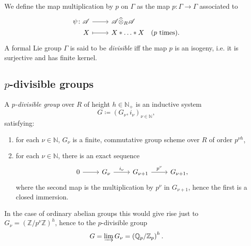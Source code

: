 \documentclass[../Main]{subfiles}
\begin{document}
\begin{defn}
	We define the map multiplication by $p$ on $\Gamma$ as the map $p\colon \Gamma \to \Gamma$
	associated to 
	\begin{equation*}
	\begin{tikzcd}[row sep = 0ex
		,/tikz/column 1/.append style={anchor=base east}
		,/tikz/column 2/.append style={anchor=base west}]
		\psi\colon \mathscr{A} \arrow[r, "", rightarrow] &
		\mathscr{A} \widehat{\otimes}_R \mathscr{A} \\
		X \arrow[r, "", mapsto] & 
		X \ast \ldots \ast X
	\quad \text{($p$ times)}
	.\end{tikzcd}
	\end{equation*} 
	A formal Lie group $\Gamma$ is said to be {\em divisible} iff the map $p$ is 
	an isogeny, i.e. it is surjective and has finite kernel.
\end{defn}


\subsection{\texorpdfstring{$p$}{p}-divisible groups}
\begin{defn}
	A {\em $p$-divisible group} over $R$ of height $h \in \mathbb{N}_+$ is an inductive system
	\begin{equation*}
	G \coloneqq \left(G_\nu, i_\nu\right)_{\nu \in \mathbb{N}}
	,\end{equation*} 
	satisfying:
	\begin{enumerate}
		\item for each $\nu \in \mathbb{N}$, $G_\nu$ is a finite, commutative group scheme over $R$
			of order $p^{\nu h}$,
		\item for each $\nu \in \mathbb{N}$, there is an exact sequence
			\begin{equation*}
			\begin{tikzcd}
				0 \arrow[r, "", rightarrow] &
				G_\nu \arrow[r, "i_\nu", rightarrow] &
				G_{\nu + 1} \arrow[r, "p^\nu", rightarrow] &
				G_{\nu + 1} 
			,\end{tikzcd}
			\end{equation*}
			where the second map is the multiplication by $p^\nu$ in $G_{\nu + 1}$,
			hence the first is a closed immersion.
	\end{enumerate}
\end{defn}

\begin{rem}[]
	In the case of ordinary abelian groups this would give rise just to 
	$G_\nu = \left( \mathbb{Z}/p^\nu\mathbb{Z} \right)^h$, hence to the $p$-divisible group
	\begin{equation*}
		G = \varinjlim G_\nu = \left( \mathbb{Q}_p / \mathbb{Z}_p \right)^h
	.\end{equation*} 
\end{rem}
\end{document}
